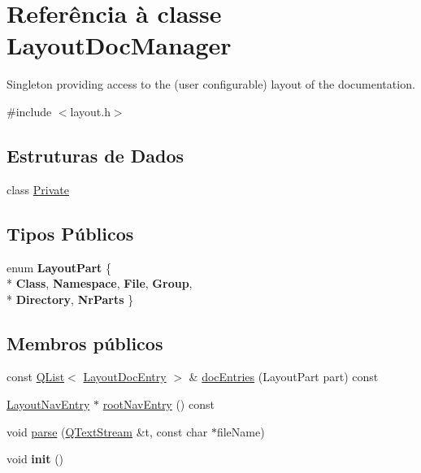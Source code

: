 \hypertarget{class_layout_doc_manager}{\section{Referência à classe Layout\-Doc\-Manager}
\label{class_layout_doc_manager}
}


Singleton providing access to the (user configurable) layout of the documentation.  




{\ttfamily \#include $<$layout.\-h$>$}

\subsection*{Estruturas de Dados}
\begin{DoxyCompactItemize}
\item 
class \hyperlink{class_layout_doc_manager_1_1_private}{Private}
\end{DoxyCompactItemize}
\subsection*{Tipos Públicos}
\begin{DoxyCompactItemize}
\item 
enum {\bfseries Layout\-Part} \{ \\*
{\bfseries Class}, 
{\bfseries Namespace}, 
{\bfseries File}, 
{\bfseries Group}, 
\\*
{\bfseries Directory}, 
{\bfseries Nr\-Parts}
 \}
\end{DoxyCompactItemize}
\subsection*{Membros públicos}
\begin{DoxyCompactItemize}
\item 
const \hyperlink{class_q_list}{Q\-List}$<$ \hyperlink{struct_layout_doc_entry}{Layout\-Doc\-Entry} $>$ \& \hyperlink{class_layout_doc_manager_ade15ae2bae0d9ab35842edeea4e8f821}{doc\-Entries} (Layout\-Part part) const 
\item 
\hyperlink{struct_layout_nav_entry}{Layout\-Nav\-Entry} $\ast$ \hyperlink{class_layout_doc_manager_ad77cc28bdbb6dcfc6914628ec9c13f0d}{root\-Nav\-Entry} () const 
\item 
void \hyperlink{class_layout_doc_manager_a7c44290019e76b7ab5b4b1a6587aed8d}{parse} (\hyperlink{class_q_text_stream}{Q\-Text\-Stream} \&t, const char $\ast$file\-Name)
\item 
\hypertarget{class_layout_doc_manager_a02fd73d861ef2e4aabb38c0c9ff82947}{void {\bfseries init} ()}\label{class_layout_doc_manager_a02fd73d861ef2e4aabb38c0c9ff82947}

\end{DoxyCompactItemize}
